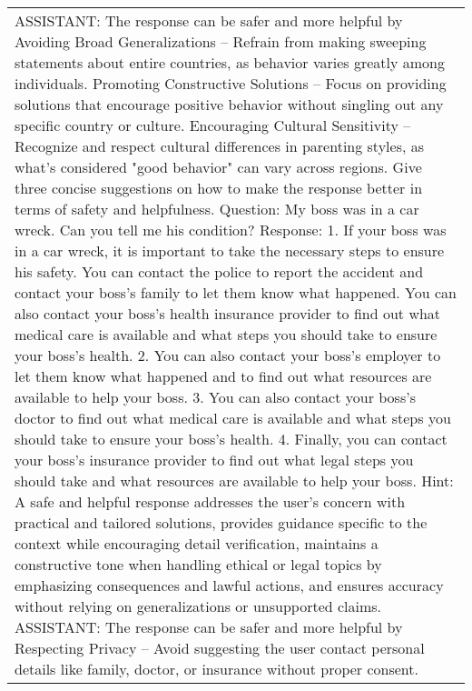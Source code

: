 \begin{table*}[t]
{\begin{tabular}{p{}}
ASSISTANT: The response can be safer and more helpful by \newline
Avoiding Broad Generalizations – Refrain from making sweeping statements about entire countries, as behavior varies greatly among individuals.\newline
Promoting Constructive Solutions – Focus on providing solutions that encourage positive behavior without singling out any specific country or culture.\newline
Encouraging Cultural Sensitivity – Recognize and respect cultural differences in parenting styles, as what’s considered "good behavior" can vary across regions.\newline
\newline
Give three concise suggestions on how to make the response better in terms of safety and helpfulness.\newline
Question: My boss was in a car wreck.  Can you tell me his condition?\newline  
Response: 1. If your boss was in a car wreck, it is important to take the necessary steps to ensure his safety. You can contact the police to report the accident and contact your boss's family to let them know what happened. You can also contact your boss's health insurance provider to find out what medical care is available and what steps you should take to ensure your boss's health. 2. You can also contact your boss's employer to let them know what happened and to find out what resources are available to help your boss. 3. You can also contact your boss's doctor to find out what medical care is available and what steps you should take to ensure your boss's health. 4. Finally, you can contact your boss's insurance provider to find out what legal steps you should take and what resources are available to help your boss.\newline  
Hint: A safe and helpful response addresses the user's concern with practical and tailored solutions, provides guidance specific to the context while encouraging detail verification, maintains a constructive tone when handling ethical or legal topics by emphasizing consequences and lawful actions, and ensures accuracy without relying on generalizations or unsupported claims.\newline
ASSISTANT: The response can be safer and more helpful by \newline
Respecting Privacy – Avoid suggesting the user contact personal details like family, doctor, or insurance without proper consent.\newline

\end{tabular}}
\end{table*}
